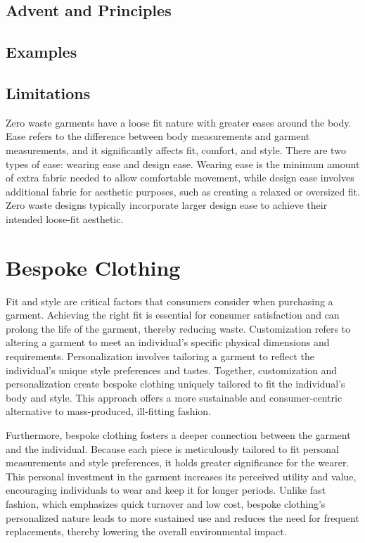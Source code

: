 \subsection{Advent and Principles}
\subsection{Examples}
\subsection{Limitations}
Zero waste garments have a loose fit nature with greater eases around the body. Ease refers to the difference between body measurements and garment measurements, and it significantly affects fit, comfort, and style. There are two types of ease: wearing ease and design ease. Wearing ease is the minimum amount of extra fabric needed to allow comfortable movement, while design ease involves additional fabric for aesthetic purposes, such as creating a relaxed or oversized fit. Zero waste designs typically incorporate larger design ease to achieve their intended loose-fit aesthetic.

\section{Bespoke Clothing}
Fit and style are critical factors that consumers consider when purchasing a garment. Achieving the right fit is essential for consumer satisfaction and can prolong the life of the garment, thereby reducing waste. Customization refers to altering a garment to meet an individual’s specific physical dimensions and requirements. Personalization involves tailoring a garment to reflect the individual’s unique style preferences and tastes. Together, customization and personalization create bespoke clothing uniquely tailored to fit the individual’s body and style. This approach offers a more sustainable and consumer-centric alternative to mass-produced, ill-fitting fashion.

Furthermore, bespoke clothing fosters a deeper connection between the garment and the individual. Because each piece is meticulously tailored to fit personal measurements and style preferences, it holds greater significance for the wearer. This personal investment in the garment increases its perceived utility and value, encouraging individuals to wear and keep it for longer periods. Unlike fast fashion, which emphasizes quick turnover and low cost, bespoke clothing’s personalized nature leads to more sustained use and reduces the need for frequent replacements, thereby lowering the overall environmental impact.

